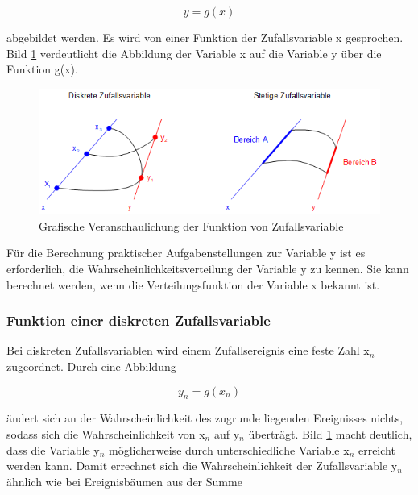 \begin{equation}\label{eq:fourseventysix}
y=g(x)
\end{equation}

\noindent abgebildet werden. Es wird von einer Funktion der Zufallsvariable x gesprochen. Bild \ref{fig:DarstellungFunktionVonZufallsvariablen} verdeutlicht die Abbildung der Variable x auf die Variable y \"{u}ber die Funktion g(x).

\noindent 
\begin{figure}[H]
  \centerline{\includegraphics[width=1\textwidth]{Kapitel4/Bilder/image5}}
  \caption{Grafische Veranschaulichung der Funktion von Zufallsvariable}
  \label{fig:DarstellungFunktionVonZufallsvariablen}
\end{figure}

\noindent F\"{u}r die Berechnung praktischer Aufgabenstellungen zur Variable y ist es erforderlich, die Wahrscheinlichkeitsverteilung der Variable y zu kennen. Sie kann berechnet werden, wenn die Verteilungsfunktion der Variable x bekannt ist.

\subsubsection{Funktion einer diskreten Zufallsvariable}

\noindent Bei diskreten Zufallsvariablen wird einem Zufallsereignis eine feste Zahl x$_{n}$ zugeordnet. Durch eine Abbildung

\begin{equation}\label{eq:fourseventyseven}
y_{n} =g(x_{n})
\end{equation}

\noindent ändert sich an der Wahrscheinlichkeit des zugrunde liegenden Ereignisses nichts, sodass sich die Wahrscheinlichkeit von x$_{n}$ auf y$_{n}$ \"{u}bertr\"{a}gt. Bild \ref{fig:DarstellungFunktionVonZufallsvariablen} macht deutlich, dass die Variable y$_{n}$ m\"{o}glicherweise durch unterschiedliche Variable x$_{n}$ erreicht werden kann. Damit errechnet sich die Wahrscheinlichkeit der Zufallsvariable y$_{n}$ \"{a}hnlich wie bei Ereignisb\"{a}umen aus der Summe

